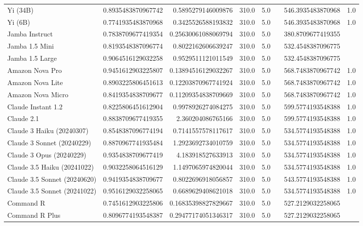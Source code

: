 \begin{table}[htp]
{\begin{tabular}{lrrrrrrr}
Yi (34B) & 0.8935483870967742 & 0.5895279146009876 & 310.0 & 5.0 &  & 546.3935483870968 & 1.0 \\
Yi (6B) & 0.7741935483870968 & 0.3425526588193832 & 310.0 & 5.0 &  & 546.3935483870968 & 1.0 \\
Jamba Instruct & 0.7838709677419354 & 0.25630061088069794 & 310.0 & 5.0 &  & 380.8709677419355 &  \\
Jamba 1.5 Mini & 0.8193548387096774 & 0.8022162606639247 & 310.0 & 5.0 &  & 532.4548387096775 &  \\
Jamba 1.5 Large & 0.9064516129032258 & 0.9529511121011549 & 310.0 & 5.0 &  & 532.4548387096775 &  \\
Amazon Nova Pro & 0.9451612903225807 & 0.13894516129032267 & 310.0 & 5.0 &  & 568.7483870967742 & 1.0 \\
Amazon Nova Lite & 0.8903225806451613 & 0.12203870967741924 & 310.0 & 5.0 &  & 568.7483870967742 & 1.0 \\
Amazon Nova Micro & 0.8419354838709677 & 0.11209354838709669 & 310.0 & 5.0 &  & 568.7483870967742 & 1.0 \\
Claude Instant 1.2 & 0.8225806451612904 & 0.9978926274084275 & 310.0 & 5.0 &  & 599.5774193548388 & 1.0 \\
Claude 2.1 & 0.8838709677419355 & 2.360204086765166 & 310.0 & 5.0 &  & 599.5774193548388 & 1.0 \\
Claude 3 Haiku (20240307) & 0.8548387096774194 & 0.7141557578117617 & 310.0 & 5.0 &  & 534.5774193548388 & 1.0 \\
Claude 3 Sonnet (20240229) & 0.8870967741935484 & 1.2923692734010759 & 310.0 & 5.0 &  & 534.5774193548388 & 1.0 \\
Claude 3 Opus (20240229) & 0.9354838709677419 & 4.183918527633913 & 310.0 & 5.0 &  & 534.5774193548388 & 1.0 \\
Claude 3.5 Haiku (20241022) & 0.9032258064516129 & 1.1497065974820044 & 310.0 & 5.0 &  & 534.5774193548388 & 1.0 \\
Claude 3.5 Sonnet (20240620) & 0.9419354838709677 & 0.8022696918056857 & 310.0 & 5.0 &  & 543.5774193548388 & 1.0 \\
Claude 3.5 Sonnet (20241022) & 0.9516129032258065 & 0.6689629408621018 & 310.0 & 5.0 &  & 534.5774193548388 & 1.0 \\
Command R & 0.7451612903225806 & 0.16835398827829667 & 310.0 & 5.0 &  & 527.2129032258065 &  \\
Command R Plus & 0.8096774193548387 & 0.29477174051346317 & 310.0 & 5.0 &  & 527.2129032258065 &  \\

\end{tabular}}
\end{table}
